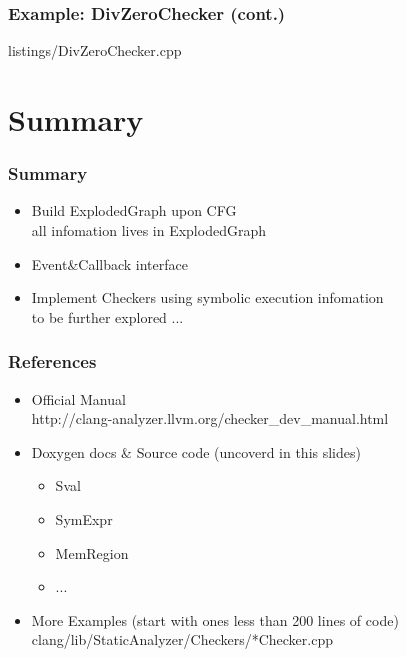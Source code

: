 \documentclass[]{beamer}
\begin{document}
\begin{frame}
  \frametitle{Example: DivZeroChecker (cont.)}
  
                  {listings/DivZeroChecker.cpp}
\end{frame}

\section{Summary}
\frame{\tableofcontents[currentsection]}

\begin{frame}
  \frametitle{Summary}
  \begin{itemize}
    \item Build ExplodedGraph upon CFG\\
      all infomation lives in ExplodedGraph
    \item Event\&Callback interface
    \item Implement Checkers using symbolic execution infomation\\
      \alert{to be further explored ...}
  \end{itemize}
\end{frame}

\begin{frame}
\frametitle{References}
  \begin{itemize}
    \item Official Manual\\
      http://clang-analyzer.llvm.org/checker\_dev\_manual.html
    \item Doxygen docs \& Source code (uncoverd in this slides)
      \begin{itemize}
        \item Sval
        \item SymExpr
        \item MemRegion
        \item ...
      \end{itemize}
    \item More Examples (start with ones less than 200 lines of code)\\
      clang/lib/StaticAnalyzer/Checkers/*Checker.cpp
  \end{itemize}
\end{frame}

\end{document}
